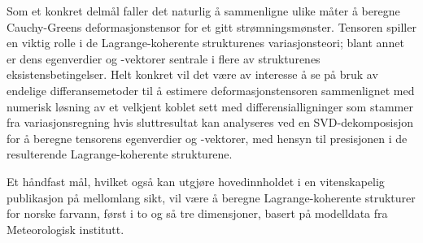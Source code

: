 Som et konkret delmål faller det naturlig å sammenligne ulike måter å beregne
Cauchy-Greens deformasjonstensor for et gitt strømningsmønster. Tensoren
spiller en viktig rolle i de Lagrange-koherente strukturenes variasjonsteori;
blant annet er dens egenverdier og -vektorer sentrale i flere av
strukturenes eksistensbetingelser. Helt konkret vil det være av interesse å
se på bruk av endelige differansemetoder til å estimere
deformasjonstensoren sammenlignet med numerisk løsning av et velkjent koblet
sett med differensialligninger som stammer fra variasjonsregning hvis
sluttresultat kan analyseres ved en SVD-dekomposisjon for å beregne
tensorens egenverdier og -vektorer, med hensyn til presisjonen i de resulterende
Lagrange-koherente strukturene.

Et håndfast mål, hvilket også kan utgjøre hovedinnholdet i en vitenskapelig
publikasjon på mellomlang sikt, vil være å beregne Lagrange-koherente strukturer
for norske farvann, først i to og så tre dimensjoner, basert på modelldata fra
Meteorologisk institutt.
